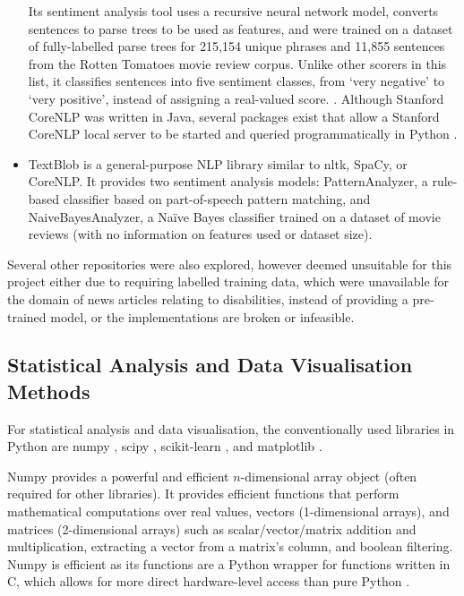 \documentclass{report}
\begin{document}
\begin{itemize}
		Its sentiment analysis tool uses a recursive neural network model, converts sentences to parse trees to be used as features, and were trained on a dataset of fully-labelled parse trees for 215,154 unique phrases and 11,855 sentences from the Rotten Tomatoes movie review corpus. 
		Unlike other scorers in this list, it classifies sentences into five sentiment classes, from `very negative' to `very positive', instead of assigning a real-valued score. \cite{socher2013recursive}.
		Although Stanford CoreNLP was written in Java, several packages exist that allow a Stanford CoreNLP local server to be started and queried programmatically in Python \cite{stanfordcorenlp}.
	\item TextBlob \cite{textblob} is a general-purpose NLP library similar to nltk, SpaCy, or CoreNLP.
		It provides two sentiment analysis models: PatternAnalyzer, a rule-based classifier based on part-of-speech pattern matching, and NaiveBayesAnalyzer, a Na\"{i}ve Bayes classifier trained on a dataset of movie reviews (with no information on features used or dataset size). 
\end{itemize}

Several other repositories were also explored, however deemed unsuitable for this project either due to requiring labelled training data, which were unavailable for the domain of news articles relating to disabilities, instead of providing a pre-trained model, or the implementations are broken or infeasible.

\subsection{Statistical Analysis and Data Visualisation Methods} \label{tc-visualisation}
For statistical analysis and data visualisation, the conventionally used libraries in Python are numpy \cite{Numpy}, scipy \cite{Scipy}, scikit-learn \cite{Scikit-learn}, and matplotlib \cite{Matplotlib}.

Numpy \cite{Numpy} provides a powerful and efficient $n$-dimensional array object (often required for other libraries).
It provides efficient functions that perform mathematical computations over real values, vectors (1-dimensional arrays), and matrices (2-dimensional arrays) such as scalar/vector/matrix addition and multiplication, extracting a vector from a matrix's column, and boolean filtering.
Numpy is efficient as its functions are a Python wrapper for functions written in C, which allows for more direct hardware-level access than pure Python \cite{Numpy-c}.
\end{document}
